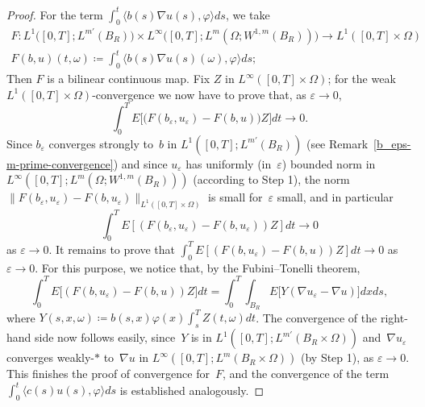 \documentclass[a4paper,10pt]{article}
\newcommand\1{\mathbbm{1}}
\newcommand{\lan}{\langle}
\newcommand{\ran}{\rangle}
\newcommand{\eps}{\varepsilon}
\numberwithin{equation}{section}
\begin{document}
\begin{proof}
For the term $\int^t_0 \lan b(s)\nabla u(s), \varphi \ran ds$, we take 
\begin{gather*}
F \colon L^1\big([0,T];L^{m'}(B_R) \big) \times L^\infty \big([0,T]; L^m(\Omega;W^{1,m}(B_R))\big) \rightarrow L^1([0,T]\times\Omega) \\
F(b,u)(t,\omega) \coloneqq  \int^t_0 \lan b(s)\nabla u(s)(\omega), \varphi \ran ds;
\end{gather*}
Then $F$ is a bilinear continuous map. Fix $Z$ in $L^\infty([0,T]\times\Omega)$; for the weak $L^1([0,T]\times\Omega)$-convergence we now have to prove that, as $\eps\rightarrow0$,
\begin{equation*}
\int^T_0E \big[ \big(F(b_\eps,u_\eps)-F(b,u) \big) Z \big]dt\rightarrow 0 .
\end{equation*}
Since $b_\eps$ converges strongly to~$b$ in $L^1([0,T];L^{m'}(B_R))$ (see Remark~\ref{b_eps-m-prime-convergence}) and since $u_\eps$ has uniformly (in~$\eps$) bounded norm in $L^\infty([0,T];L^m(\Omega;W^{1,m}(B_R)))$ (according to Step 1), the norm $\|F(b_\eps,u_\eps)-F(b,u_\eps)\|_{L^1([0,T]\times\Omega)}$ is small for~$\eps$ small, and in particular 
\begin{equation*}
\int^T_0E[(F(b_\eps,u_\eps)-F(b,u_\eps))Z]dt \rightarrow 0
\end{equation*}
as $\eps \rightarrow 0$. It remains to prove that $\int^T_0E[(F(b,u_\eps)-F(b,u))Z]dt \to 0$ as $\eps \to 0$. For this purpose, we notice that, by the Fubini--Tonelli theorem,
\begin{equation*}
\int^T_0 E \big[ (F(b,u_\eps)-F(b,u))Z \big] dt=\int^T_0\int_{B_R}E \big[Y (\nabla u_\eps - \nabla u) \big]dxds ,
\end{equation*}
where $Y(s,x,\omega) \coloneqq b(s,x)\varphi(x)\int^T_s Z(t,\omega)dt$. The convergence of the right-hand side now follows easily, since~$Y$ is in $L^1([0,T];L^{m'}(B_R\times\Omega))$ and~$\nabla u_\eps$ converges weakly-$*$ to~$\nabla u$ in $L^\infty([0,T];L^m(B_R \times \Omega))$ (by Step 1), as $\eps \rightarrow 0$. This finishes the proof of convergence for~$F$, and the convergence of the term $\int^t_0 \lan c(s) u(s), \varphi \ran ds$ is established analogously.


\end{proof}
\end{document}
